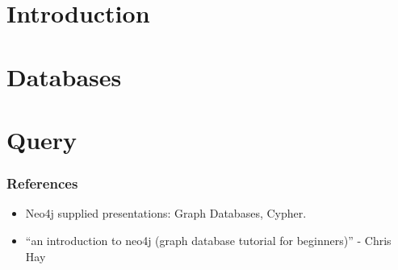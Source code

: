 \section[Intro]{Introduction}



\section[Db]{Databases}


\section[Query]{Query}


\begin{frame}\frametitle{References}
\begin{itemize}
\item Neo4j supplied presentations: Graph Databases, Cypher.
\item ``an introduction to neo4j (graph database tutorial for beginners)'' - Chris Hay
\end{itemize}
\end{frame}